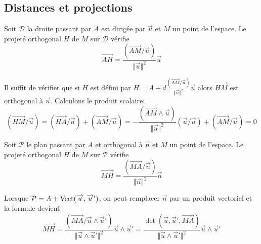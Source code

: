 \subsection{Distances et projections}
\begin{prop}
Soit $\mathcal D$ la droite passant par $A$ est dirigée par $\overrightarrow u$ et $M$ un point de l'espace. Le projeté orthogonal $H$ de $M$ sur $\mathcal D$ vérifie
 \begin{displaymath}
  \overrightarrow{AH} = \frac{(\overrightarrow{AM} /\overrightarrow u)}{\Vert\overrightarrow u\Vert^2}\overrightarrow u
 \end{displaymath}
\end{prop}
\begin{demo}
 Il suffit de vérifier que si $H$ est défini par $H=A+d\frac{(\overrightarrow{AM}/ \overrightarrow u)}{\Vert \overrightarrow u\Vert^2}\overrightarrow u$ alors $\overrightarrow{HM}$ est orthogonal à $\overrightarrow{u}$. Calculons le produit scalaire:
\begin{displaymath}
 (\overrightarrow{HM}/\overrightarrow u) = (\overrightarrow{HA}/\overrightarrow u)+(\overrightarrow{AM}/\overrightarrow u)
 = - \frac{(\overrightarrow{AM}\wedge \overrightarrow u)}{\Vert \overrightarrow u\Vert^2}(\overrightarrow u/\overrightarrow u)
+ (\overrightarrow{AM}/\overrightarrow u) = 0
\end{displaymath} 
\end{demo}
\begin{prop}
 Soit $\mathcal P$ le plan passant par $A$ et orthogonal à $\overrightarrow n$ et $M$ un point de l'espace. Le projeté orthogonal $H$ de $M$ sur $\mathcal{P}$ vérifie
\begin{displaymath}
\overrightarrow{MH} = \frac{(\overrightarrow{MA}/\overrightarrow n)}{\Vert \overrightarrow n\Vert^2}\overrightarrow n 
\end{displaymath}
\end{prop}
\begin{demo}
\end{demo}
\begin{rem}
 Lorsque $\mathcal{P}=A+\mathop{\mathrm{Vect}}(\overrightarrow{u},\overrightarrow{u}')$, on peut remplacer $\overrightarrow n$ par un produit vectoriel et la formule devient
\begin{displaymath}
\overrightarrow{MH} = \frac{(\overrightarrow{MA}/\overrightarrow{u}\wedge \overrightarrow{u}')}
                           {\Vert \overrightarrow{u}\wedge \overrightarrow{u}'\Vert^2}\overrightarrow{u}\wedge \overrightarrow{u}'
= \frac{\det(\overrightarrow{u}, \overrightarrow{u}',\overrightarrow{MA})}
{\Vert \overrightarrow{u}\wedge \overrightarrow{u}'\Vert^2}\overrightarrow{u}\wedge \overrightarrow{u}'
\end{displaymath} 
\end{rem}

